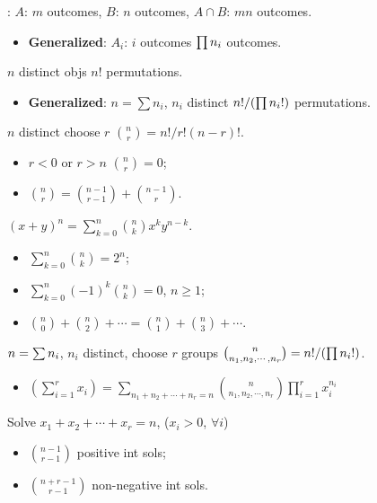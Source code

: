 : \(A\): \(m\) outcomes, \(B\): \(n\)
outcomes, \tf \(A\cap B\): \(mn\) outcomes.
\begin{itemize}
  \item \textbf{Generalized}: \(A_i\): \(i\) outcomes \tf \(\prod n_i\)
    outcomes.
\end{itemize}

 \(n\) distinct objs \tf \(n!\) permutations.
\begin{itemize}
  \item \textbf{Generalized}: \(n = \sum n_i\), \(n_i\) distinct \tf 
    \({n!}/{\left(\prod n_i!\right)}\) permutations.
\end{itemize}

 \(n\) distinct choose \(r\) \tf 
\(\binom{n}{r}=n!/r!(n-r)!\).
\begin{multicols}{2}
\begin{itemize}
  \item \(r < 0\) or \(r > n\) \tf \(\binom{n}{r} = 0\);
  \item \(\binom{n}{r}=\binom{n-1}{r-1}+\binom{n-1}{r}\).
\end{itemize}
\end{multicols}

 \((x+y)^n = \sum_{k=0}^n \binom{n}{k}x^ky^{n-k}\).
\begin{multicols}{2}
\begin{itemize}
  \item \(\sum\limits_{k=0}^{n}\binom{n}{k}=2^n\);
  \item \(\sum\limits_{k=0}^{n}(-1)^k\binom{n}{k}=0\), \(n \geq 1\);
\end{itemize} 
\end{multicols}
\begin{itemize}
  \item \(\binom{n}{0}+\binom{n}{2}+\cdots =
    \binom{n}{1}+\binom{n}{3}+\cdots\).
\end{itemize}

 \(n = \sum n_i\), \(n_i\) distinct, choose \(r\)
groups \tf \(\binom{n}{n_1, n_2, \cdots, n_r} = {n!}/{\left(\prod
  n_i!\right)}\).
\begin{itemize}
  \item \(\left(\sum\limits_{i=1}^{r}x_i\right)=\sum_{n_1 + n_2 + \cdots + n_r =
    n}\binom{n}{n_1,n_2,\cdots,n_r}\prod\limits_{i=1}^{r}x_i^{n_i}\)
\end{itemize}

 Solve \(x_1 + x_2 + \cdots + x_r = n\), (\(x_i > 0\),
\(\forall i\))
\begin{multicols}{2}
\begin{itemize}
  \item \(\binom{n-1}{r-1}\) positive int sols;
  \item \(\binom{n+r-1}{r-1}\) non-negative int sols.
\end{itemize}
\end{multicols}


